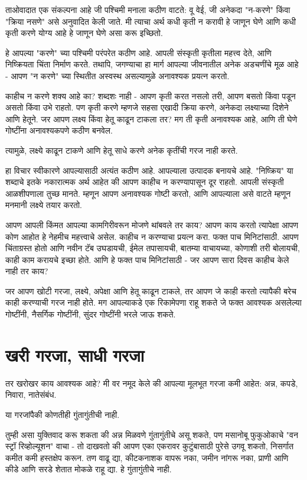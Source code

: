 ताओवादात एक संकल्पना आहे जी पश्चिमी मनाला कठीण वाटते: वू वेई, जी अनेकदा "न-करणे" किंवा "क्रिया नसणे" असे अनुवादित केली जाते. मी त्याचा अर्थ कधी कृती न करावी हे जाणून घेणे आणि कधी कृती करणे योग्य आहे हे जाणून घेणे असा करू इच्छितो.

हे आपल्या "करणे" च्या पश्चिमी परंपरेत कठीण आहे. आपली संस्कृती कृतीला महत्त्व देते, आणि निष्क्रियता चिंता निर्माण करते. तथापि, जगण्याचा हा मार्ग आपल्या जीवनातील अनेक अडचणींचे मूळ आहे - आपण "न करणे" च्या स्थितीत अस्वस्थ असल्यामुळे अनावश्यक प्रयत्न करतो.

काहीच न करणे शक्य आहे का? शब्दशः नाही - आपण कृती करत नसलो तरी, आपण बसतो किंवा पडून असतो किंवा उभे राहतो. पण कृती करणे म्हणजे सहसा एखादी क्रिया करणे, अनेकदा लक्ष्याच्या दिशेने आणि हेतूने. जर आपण लक्ष्य किंवा हेतू काढून टाकला तर? मग ती कृती अनावश्यक आहे, आणि ती घेणे गोष्टींना अनावश्यकपणे कठीण बनवेल.

त्यामुळे, लक्ष्ये काढून टाकणे आणि हेतू साधे करणे अनेक कृतींची गरज नाही करते.

हा विचार स्वीकारणे आपल्यासाठी अत्यंत कठीण आहे. आपल्याला उत्पादक बनायचे आहे. "निष्क्रिय" या शब्दाचे इतके नकारात्मक अर्थ आहेत की आपण काहीच न करण्यापासून दूर राहतो. आपली संस्कृती आळशीपणाला तुच्छ मानते. म्हणून आपण अनावश्यक गोष्टी करतो, आणि आपल्याला असे वाटते म्हणून मनमानी लक्ष्ये तयार करतो.

आपण आपली किंमत आपल्या कामगिरीवरून मोजणे थांबवले तर काय? आपण काय करतो त्यापेक्षा आपण कोण आहोत हे नेहमीच महत्त्वाचे असेल. काहीच न करण्याचा प्रयत्न करा. फक्त पाच मिनिटांसाठी. आपण चिंताग्रस्त होतो आणि नवीन टॅब उघडायची, ईमेल तपासायची, बातम्या वाचायच्या, कोणाशी तरी बोलायची, काही काम करायचे इच्छा होते. आणि हे फक्त पाच मिनिटांसाठी - जर आपण सारा दिवस काहीच केले नाही तर काय?

जर आपण खोटी गरजा, लक्ष्ये, अपेक्षा आणि हेतू काढून टाकले, तर आपण जे काही करतो त्यापैकी बरेच काही करण्याची गरज नाही होते. मग आपल्याकडे एक रिकामेपणा राहू शकते जे फक्त आवश्यक असलेल्या गोष्टींनी, नैसर्गिक गोष्टींनी, सुंदर गोष्टींनी भरले जाऊ शकते.

\chapter{खरी गरजा, साधी गरजा}

तर खरोखर काय आवश्यक आहे? मी वर नमूद केले की आपल्या मूलभूत गरजा कमी आहेत: अन्न, कपडे, निवारा, नातेसंबंध.

या गरजांपैकी कोणतीही गुंतागुंतीची नाही.

तुम्ही असा युक्तिवाद करू शकता की अन्न मिळवणे गुंतागुंतीचे असू शकते, पण मसानोबू फुकुओकाचे "वन स्ट्रॉ रिव्होल्यूशन" वाचा - तो दाखवतो की आपण एका एकरावर कुटुंबासाठी पुरेसे उगवू शकतो, निसर्गात कमीत कमी हस्तक्षेप करून. तण वाढू द्या, कीटकनाशक वापरू नका, जमीन नांगरू नका, प्राणी आणि कीडे आणि सरडे शेतात मोकळे राहू द्या. हे गुंतागुंतीचे नाही.

